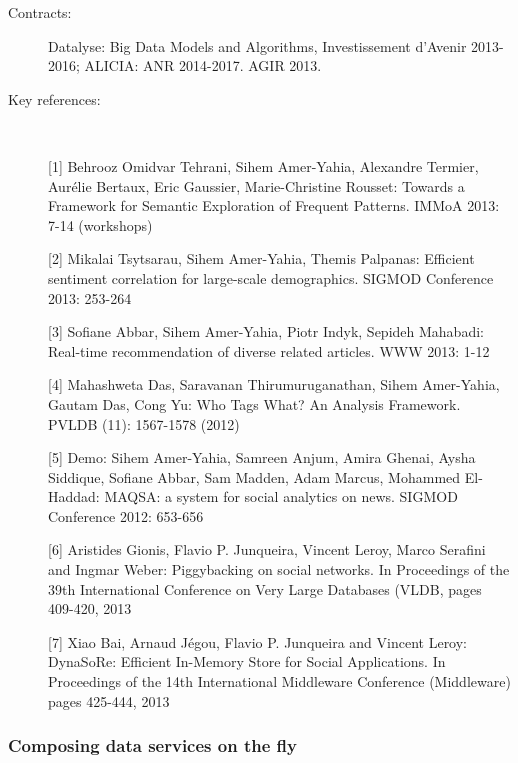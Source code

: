 \begin{description}

\item[Contracts:]  
Datalyse: Big Data Models and Algorithms, Investissement d'Avenir 2013-2016; ALICIA: ANR 2014-2017.  AGIR 2013.
  
\item[Key references:]~%

[1]   Behrooz Omidvar Tehrani, Sihem Amer-Yahia, Alexandre Termier, Aur{\'e}lie Bertaux, Eric Gaussier, Marie-Christine Rousset: Towards a Framework for Semantic Exploration of Frequent Patterns. IMMoA 2013: 7-14 (workshops) 

[2]  Mikalai Tsytsarau, Sihem Amer-Yahia, Themis Palpanas: Efficient sentiment correlation for large-scale demographics. SIGMOD Conference 2013: 253-264

[3]  Sofiane Abbar, Sihem Amer-Yahia, Piotr Indyk, Sepideh Mahabadi: Real-time recommendation of diverse related articles. WWW 2013: 1-12

[4]  Mahashweta Das, Saravanan Thirumuruganathan, Sihem Amer-Yahia, Gautam Das, Cong Yu: Who Tags What? An Analysis Framework. PVLDB (11): 1567-1578 (2012)

[5]  Demo: Sihem Amer-Yahia, Samreen Anjum, Amira Ghenai, Aysha Siddique, Sofiane Abbar, Sam Madden, Adam Marcus, Mohammed El-Haddad: MAQSA: a system for social analytics on news. SIGMOD Conference 2012: 653-656

[6] Aristides Gionis, Flavio P. Junqueira, Vincent Leroy, Marco Serafini and Ingmar Weber: Piggybacking on social networks. In Proceedings of the 39th International Conference on Very Large Databases (VLDB, pages 409-420, 2013

[7]  Xiao Bai, Arnaud J{\'e}gou, Flavio P. Junqueira and Vincent Leroy:  DynaSoRe: Efficient In-Memory Store for Social Applications. In Proceedings of the 14th International Middleware Conference (Middleware)  pages 425-444, 2013

\end{description}

\subsubsection{Composing data services on the fly }


